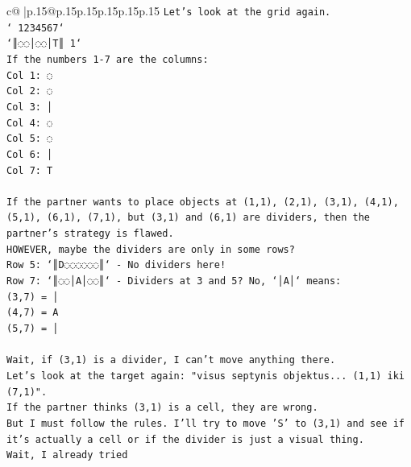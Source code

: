 \documentclass{article}
\begin{document}
{\begin{supertabular}{c@{$\;$}|p{.15\linewidth}@{}p{.15\linewidth}p{.15\linewidth}p{.15\linewidth}p{.15\linewidth}p{.15\linewidth}}
{{{\texttt{Let's look at the grid again.} \\
\texttt{` 1234567`} \\
\texttt{`║◌◌│◌◌│T║ 1`} \\
\texttt{If the numbers 1{-}7 are the columns:} \\
\texttt{Col 1: ◌} \\
\texttt{Col 2: ◌} \\
\texttt{Col 3: │} \\
\texttt{Col 4: ◌} \\
\texttt{Col 5: ◌} \\
\texttt{Col 6: │} \\
\texttt{Col 7: T} \\
\\ 
\texttt{If the partner wants to place objects at (1,1), (2,1), (3,1), (4,1), (5,1), (6,1), (7,1), but (3,1) and (6,1) are dividers, then the partner's strategy is flawed.} \\
\texttt{HOWEVER, maybe the dividers are only in some rows?} \\
\texttt{Row 5: `║D◌◌◌◌◌◌║` {-} No dividers here!} \\
\texttt{Row 7: `║◌◌│A│◌◌║` {-} Dividers at 3 and 5? No, `│A│` means:} \\
\texttt{(3,7) = │} \\
\texttt{(4,7) = A} \\
\texttt{(5,7) = │} \\
\\ 
\texttt{Wait, if (3,1) is a divider, I can't move anything there.} \\
\texttt{Let's look at the target again: "visus septynis objektus... (1,1) iki (7,1)".} \\
\texttt{If the partner thinks (3,1) is a cell, they are wrong.} \\
\texttt{But I must follow the rules. I'll try to move 'S' to (3,1) and see if it's actually a cell or if the divider is just a visual thing.} \\
\texttt{Wait, I already tried} \\
            }
        }
    }
     \\ \\


\end{supertabular}}
\end{document}
